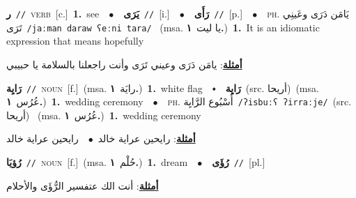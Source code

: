 \documentclass[10pt,a4paper,twoside]{article} %
\begin{document}
\begin{multicols}{2}
{{{{{\setlength\topsep{0pt}\textbf{\foreignlanguage{arabic}{ر}}\ {\color{gray}\texttt{//}\color{black}}\ \textsc{verb}\ [c.]\ \textbf{1.}~see\ \ $\bullet$\ \ \setlength\topsep{0pt}\textbf{\foreignlanguage{arabic}{يَرَى}}\ {\color{gray}\texttt{//}\color{black}}\ [i.]\ \ $\bullet$\ \ \setlength\topsep{0pt}\textbf{\foreignlanguage{arabic}{رَأَى}}\ {\color{gray}\texttt{//}\color{black}}\ [p.]\ \ $\bullet$\ \ \textsc{ph.} \color{gray} \foreignlanguage{arabic}{يَامَن دَرَى وعَينِي تَرَى}\color{black}\ {\color{gray}\texttt{/{\sffamily jaːman daraw ʕeːni tara}/}\color{black}}\ \color{gray} (msa. \foreignlanguage{arabic}{يا ليت}~\foreignlanguage{arabic}{\textbf{١.}})\color{black}\ \textbf{1.}~It is an idiomatic expression that means hopefully\  \begin{flushright}\color{gray}\foreignlanguage{arabic}{\textbf{\underline{\foreignlanguage{arabic}{أمثلة}}}: يامَن دَرَى وعيني تَرَى وأنت راجعلنا بالسلامة يا حبيبي}\end{flushright}\color{black}} \vspace{2mm}

{\setlength\topsep{0pt}\textbf{\foreignlanguage{arabic}{رَايِة}}\ {\color{gray}\texttt{//}\color{black}}\ \textsc{noun}\ [f.]\ \color{gray}(msa. \foreignlanguage{arabic}{رايَة}~\foreignlanguage{arabic}{\textbf{١.}})\color{black}\ \textbf{1.}~white flag\ \ $\smblkdiamond$\ \ \setlength\topsep{0pt}\textbf{\foreignlanguage{arabic}{رَايِة}}\ (src. \color{gray}\foreignlanguage{arabic}{أريحا}\color{black})\ \color{gray}(msa. \foreignlanguage{arabic}{عُرُس}~\foreignlanguage{arabic}{\textbf{١.}})\color{black}\ \textbf{1.}~wedding ceremony\ \ $\bullet$\ \ \textsc{ph.} \color{gray} \foreignlanguage{arabic}{أُسْبُوع الرَّايِة}\color{black}\ {\color{gray}\texttt{/{\sffamily ʔisbuːʕ ʔirraːje}/}\color{black}}\ \color{gray}(src. \foreignlanguage{arabic}{أريحا})\color{black}\ \color{gray} (msa. \foreignlanguage{arabic}{عُرُس}~\foreignlanguage{arabic}{\textbf{١.}})\color{black}\ \textbf{1.}~wedding ceremony\  \begin{flushright}\color{gray}\foreignlanguage{arabic}{\textbf{\underline{\foreignlanguage{arabic}{أمثلة}}}: رايحين عراية خالد\ $\bullet$\ \  رايحين عراية خالد}\end{flushright}\color{black}} \vspace{2mm}

{\setlength\topsep{0pt}\textbf{\foreignlanguage{arabic}{رُؤيَا}}\ {\color{gray}\texttt{//}\color{black}}\ \textsc{noun}\ [f.]\ \color{gray}(msa. \foreignlanguage{arabic}{حُلْم}~\foreignlanguage{arabic}{\textbf{١.}})\color{black}\ \textbf{1.}~dream\ \ $\bullet$\ \ \setlength\topsep{0pt}\textbf{\foreignlanguage{arabic}{رُؤَى}}\ {\color{gray}\texttt{//}\color{black}}\ [pl.]\  \begin{flushright}\color{gray}\foreignlanguage{arabic}{\textbf{\underline{\foreignlanguage{arabic}{أمثلة}}}: أنت الك عتفسير الرُّؤَى والأحلام}\end{flushright}\color{black}} \vspace{2mm}

}}}}
\end{multicols}
\end{document}
